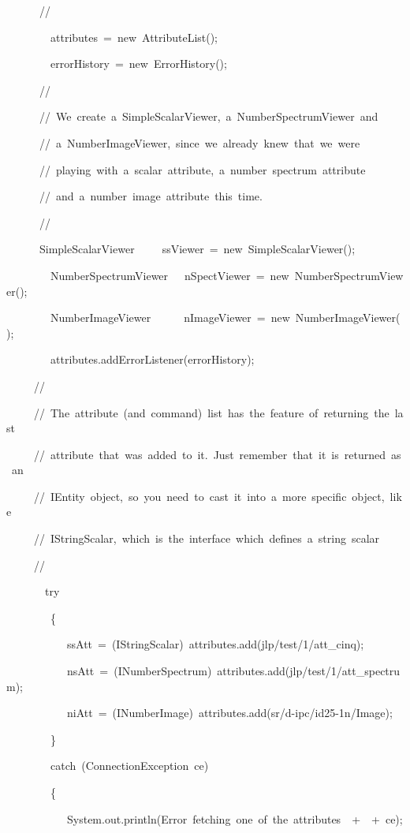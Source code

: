 \begin{lyxcode}
~~~~~~//

~~~~~~~~attributes~=~new~AttributeList();~

~~~~~~~~errorHistory~=~new~ErrorHistory();

~~~~~~//

~~~~~~//~We~create~a~SimpleScalarViewer,~a~NumberSpectrumViewer~and

~~~~~~//~a~NumberImageViewer,~since~we~already~knew~that~we~were

~~~~~~//~playing~with~a~scalar~attribute,~a~number~spectrum~attribute

~~~~~~//~and~a~number~image~attribute~this~time.

~~~~~~//

~~~~~~SimpleScalarViewer~~~~~ssViewer~=~new~SimpleScalarViewer();

~~~~~~~~NumberSpectrumViewer~~~nSpectViewer~=~new~NumberSpectrumViewer();

~~~~~~~~NumberImageViewer~~~~~~nImageViewer~=~new~NumberImageViewer();

~~~~~~~~attributes.addErrorListener(errorHistory);

~~~~~//

~~~~~//~The~attribute~(and~command)~list~has~the~feature~of~returning~the~last

~~~~~//~attribute~that~was~added~to~it.~Just~remember~that~it~is~returned~as~an

~~~~~//~IEntity~object,~so~you~need~to~cast~it~into~a~more~specific~object,~like

~~~~~//~IStringScalar,~which~is~the~interface~which~defines~a~string~scalar

~~~~~//

~~~~~~~try

~~~~~~~~\{



~~~~~~~~~~~ssAtt~=~(IStringScalar)~attributes.add(\textquotedbl{}jlp/test/1/att\_cinq\textquotedbl{});

~~~~~~~~~~~nsAtt~=~(INumberSpectrum)~attributes.add(\textquotedbl{}jlp/test/1/att\_spectrum\textquotedbl{});

~~~~~~~~~~~niAtt~=~(INumberImage)~attributes.add(\textquotedbl{}sr/d-ipc/id25-1n/Image\textquotedbl{});

~~~~~~~~\}

~~~~~~~~catch~(ConnectionException~ce)

~~~~~~~~\{

~~~~~~~~~~~System.out.println(\textquotedbl{}Error~fetching~one~of~the~attributes~~\textquotedbl{}+\textquotedbl{}~\textquotedbl{}~+~ce);


\end{lyxcode}
